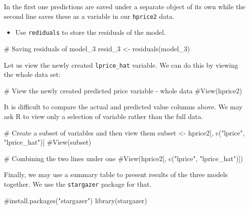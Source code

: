 \documentclass[
  letterpaper,
  DIV=11,
  numbers=noendperiod]{scrreprt}
\newenvironment{Shaded}{\begin{snugshade}}{\end{snugshade}}
\newcommand{\CommentTok}[1]{\textcolor[rgb]{0.37,0.37,0.37}{#1}}
\newcommand{\FunctionTok}[1]{\textcolor[rgb]{0.28,0.35,0.67}{#1}}
\newcommand{\NormalTok}[1]{\textcolor[rgb]{0.00,0.23,0.31}{#1}}
\newcommand{\OtherTok}[1]{\textcolor[rgb]{0.00,0.23,0.31}{#1}}
\newcommand{\StringTok}[1]{\textcolor[rgb]{0.13,0.47,0.30}{#1}}
\providecommand{\tightlist}{%
  \setlength{\itemsep}{0pt}\setlength{\parskip}{0pt}}\usepackage{longtable,booktabs,array}
\begin{document}
In the first one predictions are saved under a separate object of its
own while the second line saves these as a variable in our
\texttt{hprice2} data.

\begin{itemize}
\tightlist
\item
  Use \texttt{rediduals} to store the residuals of the model.
\end{itemize}

\begin{Shaded}
\begin{Highlighting}[]
\CommentTok{\# Saving residuals of model\_3}
\NormalTok{resid\_3 }\OtherTok{\textless{}{-}} \FunctionTok{residuals}\NormalTok{(model\_3)}
\end{Highlighting}
\end{Shaded}

Let us view the newly created \texttt{lprice\_hat} variable. We can do
this by viewing the whole data set:

\begin{Shaded}
\begin{Highlighting}[]
\CommentTok{\# View the newly created predicted price variable {-} whole data}
\CommentTok{\#View(hprice2)}
\end{Highlighting}
\end{Shaded}

It is difficult to compare the actual and predicted value columns above.
We may ask R to view only a selection of variable rather than the full
data.

\begin{Shaded}
\begin{Highlighting}[]
\CommentTok{\# Create a subset of variables and then view them}
\NormalTok{subset }\OtherTok{\textless{}{-}}\NormalTok{ hprice2[, }\FunctionTok{c}\NormalTok{(}\StringTok{"lprice"}\NormalTok{, }\StringTok{"lprice\_hat"}\NormalTok{)]}
\CommentTok{\#View(subset)}

\CommentTok{\# Combining the two lines under one }
\CommentTok{\#View(hprice2[, c("lprice", "lprice\_hat")])}
\end{Highlighting}
\end{Shaded}

Finally, we may use a summary table to present results of the three
models together. We use the \texttt{stargazer} package for that.

\begin{Shaded}
\begin{Highlighting}[]
\CommentTok{\#install.packages("stargazer")}
\FunctionTok{library}\NormalTok{(stargazer)}
\end{Highlighting}
\end{Shaded}
\end{document}
